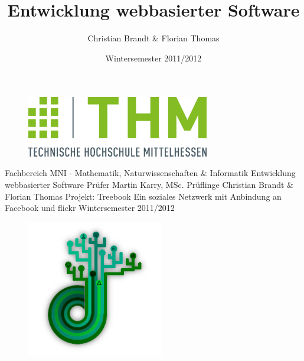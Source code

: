 \documentclass[10pt,a4paper]{book}
\author{Christian Brandt & Florian Thomas}
\title{Entwicklung webbasierter Software}
\date{Wintersemester 2011/2012}
\begin{document}
\begin{titlepage}
\begin{center}
\begin{figure}[htbp]
\centering
\includegraphics[width=8cm]{Pictures/THM_Logo.png}%
\end{figure}
\large{Fachbereich MNI - Mathematik, Naturwissenschaften \& Informatik}
\linebreak 
\linebreak
\linebreak
\linebreak
\linebreak
\linebreak
\linebreak
\LARGE{Entwicklung webbasierter Software}
\linebreak
\linebreak
\linebreak
\linebreak
\linebreak
\linebreak
\linebreak
\large{Prüfer}
\linebreak
\large{Martin Karry, MSc.}
\linebreak
\linebreak
\large{Prüflinge}
\linebreak
\large{Christian Brandt \& Florian Thomas}
\linebreak
\linebreak
\linebreak
\linebreak
\Large{Projekt: Treebook}
\linebreak
\normalsize{Ein soziales Netzwerk mit Anbindung an Facebook und flickr}
\linebreak
\linebreak
\normalsize{Wintersemester 2011/2012}
\begin{figure}[htbp]
\centering
\includegraphics[width=6cm]{Pictures/treebook_treelogo.png}%
\end{figure}
\linebreak
\linebreak
\linebreak
\linebreak
\end{center}
\end{titlepage}
\setcounter{page}{1}
\end{document}
